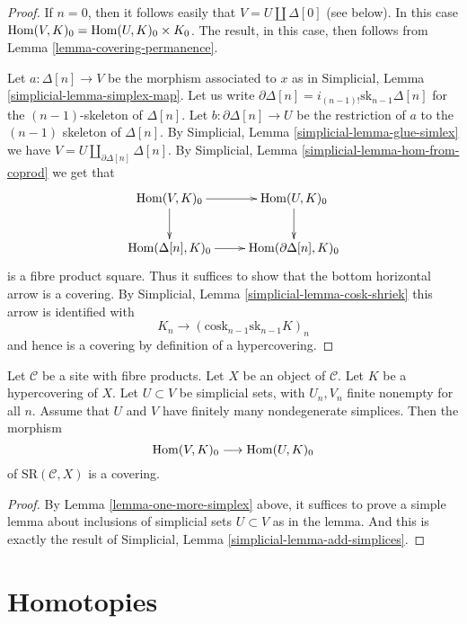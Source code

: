 \begin{proof}
If $n = 0$, then it follows easily that $V = U \amalg \Delta[0]$
(see below). In this case $\mathop{\rm Hom}\nolimits(V, K)_0 =
\mathop{\rm Hom}\nolimits(U, K)_0 \times K_0$. The result, in this case, then follows
from Lemma \ref{lemma-covering-permanence}.

\medskip\noindent
Let $a : \Delta[n] \to V$ be the morphism associated to $x$
as in Simplicial, Lemma \ref{simplicial-lemma-simplex-map}.
Let us write $\partial \Delta[n] = i_{(n-1)!} \text{sk}_{n - 1} \Delta[n]$
for the $(n - 1)$-skeleton of $\Delta[n]$.
Let $b : \partial \Delta[n] \to U$ be the restriction
of $a$ to the $(n - 1)$ skeleton of $\Delta[n]$.
By
Simplicial, Lemma
\ref{simplicial-lemma-glue-simlex}
we have $V = U \amalg_{\partial \Delta[n]} \Delta[n]$. By
Simplicial, Lemma
\ref{simplicial-lemma-hom-from-coprod}
we get that
$$
\xymatrix{
\Hom(V, K)_0 \ar[r] \ar[d] &
\Hom(U, K)_0 \ar[d] \\
\Hom(\Delta[n], K)_0 \ar[r] &
\Hom(\partial \Delta[n], K)_0
}
$$
is a fibre product square. Thus it suffices to show that
the bottom horizontal arrow is a covering. By
Simplicial, Lemma \ref{simplicial-lemma-cosk-shriek}
this arrow is identified with
$$
K_n \to (\text{cosk}_{n - 1} \text{sk}_{n - 1} K)_n
$$
and hence is a covering by definition of a hypercovering.
\end{proof}

\begin{lemma}
\label{lemma-add-simplices}
Let $\mathcal{C}$ be a site with fibre products.
Let $X$ be an object of $\mathcal{C}$.
Let $K$ be a hypercovering of $X$.
Let $U \subset V$ be simplicial sets, with $U_n, V_n$
finite nonempty for all $n$.
Assume that $U$ and $V$ have finitely many nondegenerate simplices.
Then the morphism
$$
\mathop{\rm Hom}\nolimits(V, K)_0
\longrightarrow
\mathop{\rm Hom}\nolimits(U, K)_0
$$
of $\text{SR}(\mathcal{C}, X)$ is a covering.
\end{lemma}

\begin{proof}
By Lemma \ref{lemma-one-more-simplex}
above, it suffices to prove a simple lemma
about inclusions of simplicial sets $U \subset V$ as in the
lemma. And this is exactly the result of
Simplicial, Lemma \ref{simplicial-lemma-add-simplices}.
\end{proof}




\section{Homotopies}
\label{section-homotopies}

